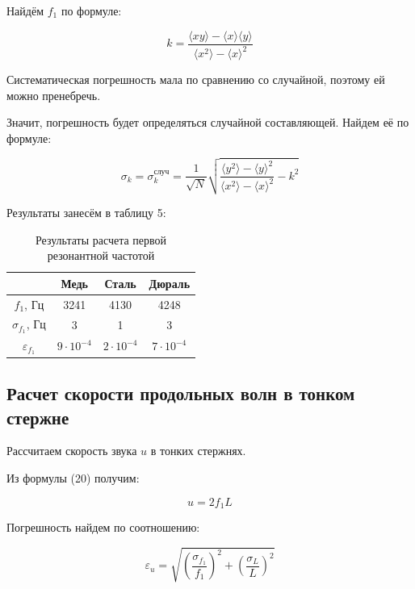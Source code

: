 \documentclass[a4paper, 12pt]{article}
\begin{document}
    Найдём $f_1$ по формуле:

    \begin{equation}
		k=\frac{\langle xy\rangle-\langle x\rangle \langle y\rangle}{\langle x^2\rangle - \langle x\rangle^2}
	\end{equation}

    Систематическая погрешность мала по сравнению со случайной, поэтому ей можно пренебречь.

    Значит, погрешность будет определяться случайной составляющей. Найдем её по формуле:

	\begin{equation}
		\sigma_k=\sigma_k^\text{случ}=\frac{1}{\sqrt{N}}\sqrt{\frac{\langle y^2 \rangle - \langle y \rangle^2}{\langle x^2 \rangle - \langle x \rangle^2} - k^2  }
	\end{equation}
    
    Результаты занесём в таблицу 5:

    \begin{table}[h]
    \centering
        \begin{tabular}{|c|c|c|c|}
        \hline
        \multicolumn{1}{|l|}{} & Медь  & Сталь & Дюраль \\ \hline
        $f_1$, Гц              & 3241  & 4130  & 4248   \\ \hline
        $\sigma_{f_1}$, Гц     & 3     & 1     & 3      \\ \hline
        $\varepsilon_{f_1}$    & $9\cdot 10^{-4}$ & $2\cdot 10^{-4}$ & $7\cdot 10^{-4}$  \\ \hline
        \end{tabular}
        \caption{Результаты расчета первой резонантной частотой}
    \end{table}

    \subsection{Расчет скорости продольных волн в тонком стержне}

    Рассчитаем скорость звука $u$ в тонких стержнях. 
    
    Из формулы (20) получим:

    \begin{equation}
        u = 2f_1L
    \end{equation}

    Погрешность найдем по соотношению:

    \begin{equation}
        \varepsilon_u = \sqrt{(\frac{\sigma_{f_1}}{f_1})^2 + (\frac{\sigma_L}{L})^2}
    \end{equation}
\end{document}
